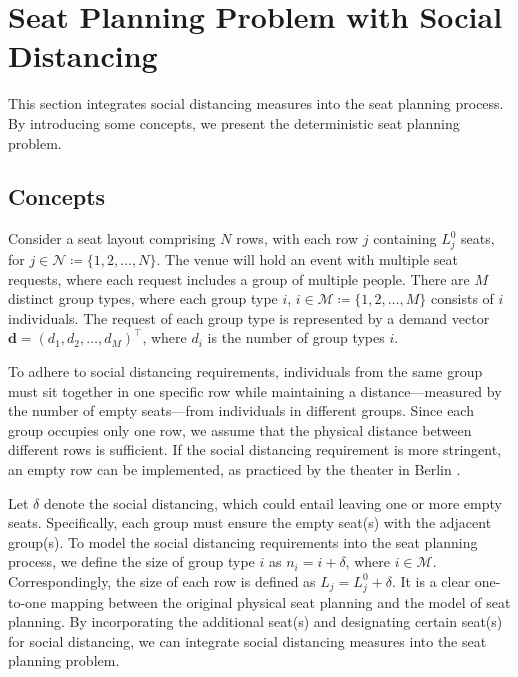 \section{Seat Planning Problem with Social Distancing}\label{problem_description}
This section integrates social distancing measures into the seat planning process. By introducing some concepts, we present the deterministic seat planning problem. 




\subsection{Concepts}
Consider a seat layout comprising $N$ rows, with each row $j$ containing $L_j^0$ seats, for $j \in \mathcal{N} \coloneqq \{1,2, \ldots, N\}$. The venue will hold an event with multiple seat requests, where each request includes a group of multiple people.
There are $M$ distinct group types, where each group type $i$, $i \in \mathcal{M} \coloneqq \{1, 2, \ldots, M\}$ consists of $i$ individuals. The request of each group type is represented by a demand vector $\mathbf{d} = (d_1, d_2, \ldots, d_M)^{\intercal}$, where $d_i$ is the number of group types $i$.

To adhere to social distancing requirements, individuals from the same group must sit together in one specific row while maintaining a distance—measured by the number of empty seats—from individuals in different groups. Since each group occupies only one row, we assume that the physical distance between different rows is sufficient. If the social distancing requirement is more stringent, an empty row can be implemented, as practiced by the theater in Berlin \cite{Berlin_theater}.

Let $\delta$ denote the social distancing, which could entail leaving one or more empty seats. Specifically, each group must ensure the empty seat(s) with the adjacent group(s). To model the social distancing requirements into the seat planning process, we define the size of group type $i$ as $n_i = i + \delta$, where $i \in \mathcal{M}$. Correspondingly, the size of each row is defined as $L_j = L_j^{0} + \delta$. It is a clear one-to-one mapping between the original physical seat planning and the model of seat planning. By incorporating the additional seat(s) and designating certain seat(s) for social distancing, we can integrate social distancing measures into the seat planning problem.

